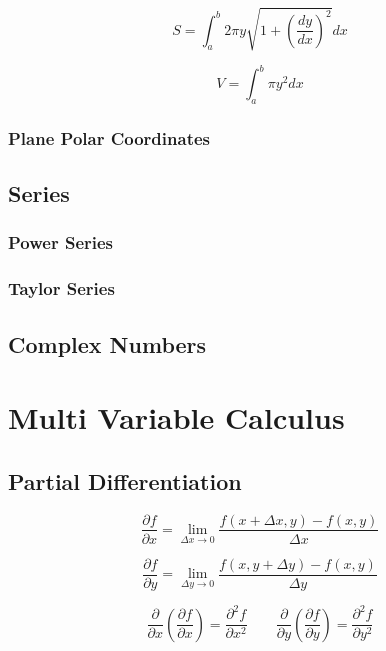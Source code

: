 \documentclass[]{report}
\begin{document}
\begin{equation*}
    S = \int_{a}^{b} 2 \pi y \sqrt{1 + \left(\frac{dy}{dx}\right)^{2}}dx
\end{equation*}

\begin{equation*}
    V = \int_{a}^{b} \pi y^{2} dx
\end{equation*}

\section{Plane Polar Coordinates}

\chapter{Series}

\section{Power Series}

\section{Taylor Series}

\chapter{Complex Numbers}

\part{Multi Variable Calculus}
\chapter{Partial Differentiation}

\begin{equation*}
    \frac{\partial f}{\partial x} = \lim_{\Delta x \to 0}\frac{f(x + \Delta x, y) - f(x, y)}{\Delta x}
\end{equation*}

\begin{equation*}
    \frac{\partial f}{\partial y} = \lim_{\Delta y \to 0}\frac{f(x, y + \Delta y) - f(x, y)}{\Delta y}
\end{equation*}

\[\frac{\partial}{\partial x}\left(\frac{\partial f}{\partial x}\right) = \frac{\partial^{2}f}{\partial x ^{2}} \qquad \frac{\partial}{\partial y}\left(\frac{\partial f}{\partial y}\right) = \frac{\partial^{2}f}{\partial y ^{2}}\]
\end{document}
